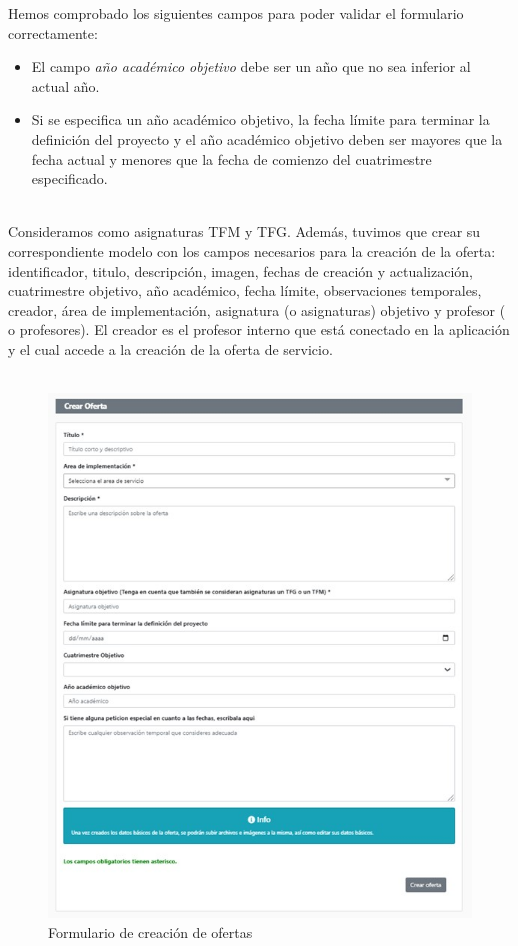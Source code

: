 \documentclass[11pt]{book}
\begin{document}
 Hemos comprobado los siguientes campos para poder validar el formulario correctamente:
 \begin{itemize} 
 	\item	El campo \emph{año académico objetivo} debe ser un año que no sea inferior al actual año.
 	\item	Si se especifica un año académico objetivo, la fecha límite para terminar la definición del proyecto y el año académico objetivo deben ser mayores que la fecha actual y menores que la fecha de comienzo del cuatrimestre especificado.\\\\
 \end{itemize}
 Consideramos como asignaturas TFM y TFG.
 Además, tuvimos que crear su correspondiente modelo con los campos necesarios para la creación de la oferta: identificador, titulo, descripción, imagen, fechas de creación y actualización, cuatrimestre objetivo, año académico, fecha límite, observaciones temporales, creador, área de implementación, asignatura (o asignaturas) objetivo y profesor ( o profesores). El creador es el profesor interno que está conectado en la aplicación y el cual accede a la creación de la oferta de servicio.\\\\
 \begin{figure}[t]
 	\centering
 	\includegraphics[scale=0.9]{oferta}
 	\caption{Formulario de creación de ofertas}
 \end{figure}
\end{document}

